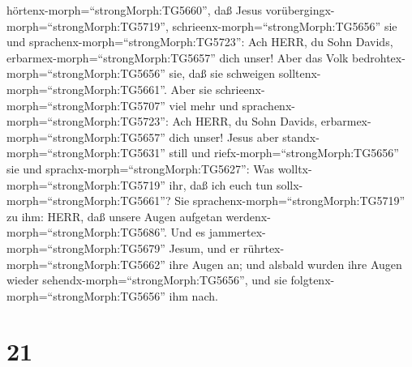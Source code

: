 hörtenx-morph=``strongMorph:TG5660'', daß Jesus
vorübergingx-morph=``strongMorph:TG5719'',
schrieenx-morph=``strongMorph:TG5656'' sie und
sprachenx-morph=``strongMorph:TG5723'': Ach HERR, du Sohn Davids,
erbarmex-morph=``strongMorph:TG5657'' dich unser!  Aber das
Volk bedrohtex-morph=``strongMorph:TG5656'' sie, daß sie schweigen
solltenx-morph=``strongMorph:TG5661''. Aber sie
schrieenx-morph=``strongMorph:TG5707'' viel mehr und
sprachenx-morph=``strongMorph:TG5723'': Ach HERR, du Sohn Davids,
erbarmex-morph=``strongMorph:TG5657'' dich unser!  Jesus
aber standx-morph=``strongMorph:TG5631'' still und
riefx-morph=``strongMorph:TG5656'' sie und
sprachx-morph=``strongMorph:TG5627'': Was
wolltx-morph=``strongMorph:TG5719'' ihr, daß ich euch tun
sollx-morph=``strongMorph:TG5661''?  Sie
sprachenx-morph=``strongMorph:TG5719'' zu ihm: HERR, daß unsere Augen
aufgetan werdenx-morph=``strongMorph:TG5686''.  Und es
jammertex-morph=``strongMorph:TG5679'' Jesum, und er
rührtex-morph=``strongMorph:TG5662'' ihre Augen an; und alsbald wurden
ihre Augen wieder sehendx-morph=``strongMorph:TG5656'', und sie
folgtenx-morph=``strongMorph:TG5656'' ihm nach.

\hypertarget{section-20}{%
\section{21}\label{section-20}}

